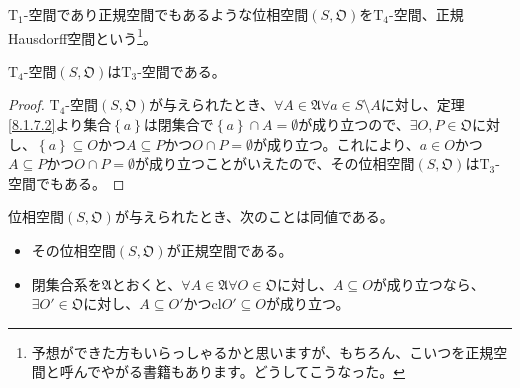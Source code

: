 \documentclass[dvipdfmx]{jsarticle}
\begin{document}
\begin{dfn}
$\mathrm{T}_{1}$-空間であり正規空間でもあるような位相空間$\left( S,\mathfrak{O} \right)$を$\mathrm{T}_{4}$-空間、正規Hausdorff空間という\footnote{予想ができた方もいらっしゃるかと思いますが、もちろん、こいつを正規空間と呼んでやがる書籍もあります。どうしてこうなった。}。
\end{dfn}
\begin{thm}\label{8.1.7.14}
$\mathrm{T}_{4}$-空間$\left( S,\mathfrak{O} \right)$は$\mathrm{T}_{3}$-空間である。
\end{thm}
\begin{proof}
$\mathrm{T}_{4}$-空間$\left( S,\mathfrak{O} \right)$が与えられたとき、$\forall A \in \mathfrak{A\forall}a \in S \setminus A$に対し、定理\ref{8.1.7.2}より集合$\left\{ a \right\}$は閉集合で$\left\{ a \right\} \cap A = \emptyset$が成り立つので、$\exists O,P \in \mathfrak{O}$に対し、$\left\{ a \right\} \subseteq O$かつ$A \subseteq P$かつ$O \cap P = \emptyset$が成り立つ。これにより、$a \in O$かつ$A \subseteq P$かつ$O \cap P = \emptyset$が成り立つことがいえたので、その位相空間$\left( S,\mathfrak{O} \right)$は$\mathrm{T}_{3}$-空間でもある。
\end{proof}
\begin{thm}\label{8.1.7.15}
位相空間$\left( S,\mathfrak{O} \right)$が与えられたとき、次のことは同値である。
\begin{itemize}
\item
  その位相空間$\left( S,\mathfrak{O} \right)$が正規空間である。
\item
  閉集合系を$\mathfrak{A}$とおくと、$\forall A \in \mathfrak{A\forall}O \in \mathfrak{O}$に対し、$A \subseteq O$が成り立つなら、$\exists O'\in \mathfrak{O}$に対し、$A \subseteq O'$かつ${\mathrm{cl}}O' \subseteq O$が成り立つ。
\end{itemize}
\end{thm}
\end{document}
